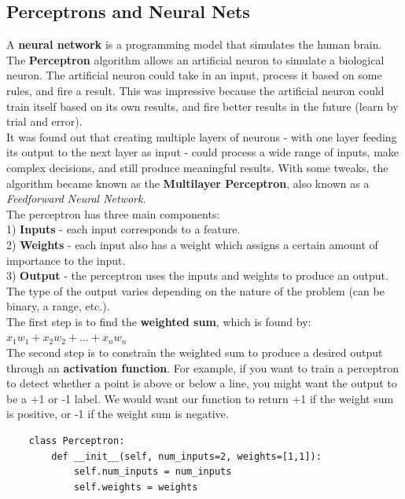 \documentclass[11pt, a4paper]{article}
\begin{document}
\begin{spacing}{1.1}
	\subsection{Perceptrons and Neural Nets}
	A \textbf{neural network} is a programming model that simulates the human brain. The \textbf{Perceptron} algorithm allows an artificial neuron to simulate a biological neuron. The artificial neuron could take in an input, process it based on some rules, and fire a result. This was impressive because the artificial neuron could train itself based on its own results, and fire better results in the future (learn by trial and error). \vspace*{1.5mm} \\
	It was found out that creating multiple layers of neurons - with one layer feeding its output to the next layer as input - could process a wide range of inputs, make complex decisions, and still produce meaningful results. With some tweaks, the algorithm became known as the \textbf{Multilayer Perceptron}, also known as a \textit{Feedforward Neural Network}. \vspace*{2mm} \\
	The perceptron has three main components: \\
	1) \textbf{Inputs} - each input corresponds to a feature. \\
	2) \textbf{Weights} - each input also has a weight which assigns a certain amount of importance to the input. \\
	3) \textbf{Output} - the perceptron uses the inputs and weights to produce an output. The type of the output \hspace*{21mm} varies depending on the nature of the problem (can be binary, a range, etc.). \vspace*{2mm} \\
	The first step is to find the \textbf{weighted sum}, which is found by: $x_1w_1 + x_2w_2 + ... + x_nw_n$ \vspace*{1.5mm} \\
	The second step is to constrain the weighted sum to produce a desired output through an \textbf{activation function}. For example, if you want to train a perceptron to detect whether a point is above or below a line, you might want the output to be a +1 or -1 label. We would want our function to return +1 if the weight sum is positive, or -1 if the weight sum is negative. 
	\begin{lstlisting}
	class Perceptron:
		def __init__(self, num_inputs=2, weights=[1,1]):
			self.num_inputs = num_inputs
			self.weights = weights
		

\end{lstlisting}
\end{spacing}
\end{document}
